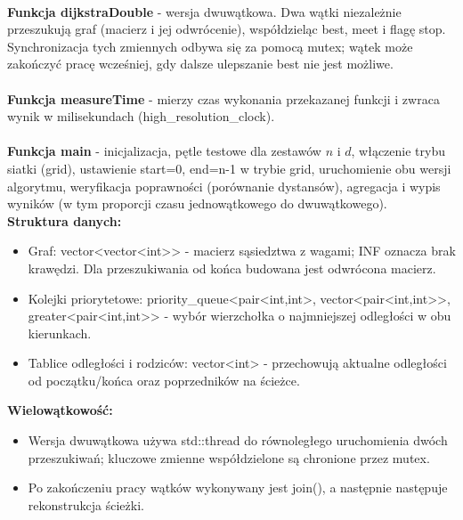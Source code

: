 \documentclass[a4paper,12pt]{article}
\begin{document}
                \vspace{-0.5em}\\
                \textbf{Funkcja dijkstraDouble} - wersja dwuwątkowa. Dwa wątki niezależnie przeszukują graf (macierz i jej odwrócenie), współdzieląc best, meet i flagę stop. Synchronizacja tych zmiennych odbywa się za pomocą mutex; wątek może zakończyć pracę wcześniej, gdy dalsze ulepszanie best nie jest możliwe.\\
                \vspace{-0.5em}\\
                \textbf{Funkcja measureTime} - mierzy czas wykonania przekazanej funkcji i zwraca wynik w milisekundach (high\_resolution\_clock).\\
                \vspace{-0.5em}\\
                \textbf{Funkcja main} - inicjalizacja, pętle testowe dla zestawów $n$ i $d$, włączenie trybu siatki (grid), ustawienie start=0, end=n-1 w trybie grid, uruchomienie obu wersji algorytmu, weryfikacja poprawności (porównanie dystansów), agregacja i wypis wyników (w tym proporcji czasu jednowątkowego do dwuwątkowego).\\
            \newpage
            \vspace*{2em}
            \hspace{-1.5em}\textbf{Struktura danych:}
            \begin{itemize}
                \item Graf: vector<vector<int>> - macierz sąsiedztwa z wagami; INF oznacza brak krawędzi. Dla przeszukiwania od końca budowana jest odwrócona macierz.
                \item Kolejki priorytetowe: priority\_queue<pair<int,int>, vector<pair<int,int>>, greater<pair<int,int>> - wybór wierzchołka o najmniejszej odległości w obu kierunkach.
                \item Tablice odległości i rodziców: vector<int> - przechowują aktualne odległości od początku/końca oraz poprzedników na ścieżce.
            \end{itemize}
            \vspace{1em}
            \textbf{Wielowątkowość:}
            \begin{itemize}
                \item Wersja dwuwątkowa używa std::thread do równoległego uruchomienia dwóch przeszukiwań; kluczowe zmienne współdzielone są chronione przez mutex.
                \item Po zakończeniu pracy wątków wykonywany jest join(), a następnie następuje rekonstrukcja ścieżki.
            \end{itemize}
\end{document}
